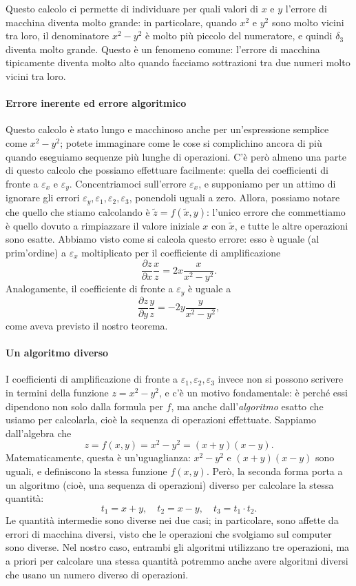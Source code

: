 \documentclass[a4paper]{report}
\theoremstyle{definition}
\theoremstyle{remark}
\begin{document}
Questo calcolo ci permette di individuare per quali valori di $x$ e $y$ l'errore di macchina diventa molto grande: in particolare, quando $x^2$ e $y^2$ sono molto vicini tra loro, il denominatore $x^2-y^2$ è molto più piccolo del numeratore, e quindi $\delta_3$ diventa molto grande. Questo è un fenomeno comune: l'errore di macchina tipicamente diventa molto alto quando facciamo sottrazioni tra due numeri molto vicini tra loro.

\paragraph{Errore inerente ed errore algoritmico} Questo calcolo è stato lungo e macchinoso anche per un'espressione semplice come $x^2-y^2$; potete immaginare come le cose si complichino ancora di più quando eseguiamo sequenze più lunghe di operazioni. C'è però almeno una parte di questo calcolo che possiamo effettuare facilmente: quella dei coefficienti di fronte a $\varepsilon_x$ e $\varepsilon_y$. Concentriamoci sull'errore $\varepsilon_x$, e supponiamo per un attimo di ignorare gli errori $\varepsilon_y, \varepsilon_1,\varepsilon_2,\varepsilon_3$, ponendoli uguali a zero. Allora, possiamo notare che quello che stiamo calcolando è $\tilde{z} = f(\tilde{x},y)$: l'unico errore che commettiamo è quello dovuto a rimpiazzare il valore iniziale $x$ con $\tilde{x}$, e tutte le altre operazioni sono esatte. Abbiamo visto come si calcola questo errore: esso è uguale (al prim'ordine) a $\varepsilon_x$ moltiplicato per il coefficiente di amplificazione
\[
\frac{\partial z}{\partial x} \frac{x}{z} = 2x\frac{x}{x^2-y^2}.
\]
Analogamente, il coefficiente di fronte a $\varepsilon_y$ è uguale a
\[
\frac{\partial z}{\partial y} \frac{y}{z} = -2y\frac{y}{x^2-y^2},
\]
come aveva previsto il nostro teorema.

\paragraph{Un algoritmo diverso}
I coefficienti di amplificazione di fronte a $\varepsilon_1,\varepsilon_2,\varepsilon_3$ invece non si possono scrivere in termini della funzione $z = x^2-y^2$, e c'è un motivo fondamentale: è perché essi dipendono non solo dalla formula per $f$, ma anche dall'\emph{algoritmo} esatto che usiamo per calcolarla, cioè la sequenza di operazioni effettuate. Sappiamo dall'algebra che
\[
z = f(x,y) = x^2 - y^2 = (x+y)(x-y).
\]
Matematicamente, questa è un'uguaglianza: $x^2-y^2$ e $(x+y)(x-y)$ sono uguali, e definiscono la stessa funzione $f(x,y)$. Però, la seconda forma porta a un algoritmo (cioè, una sequenza di operazioni) diverso per calcolare la stessa quantità:
\begin{equation}
    t_1 = x+y, \quad t_2 = x-y, \quad t_3 = t_1 \cdot t_2.    
\end{equation}
Le quantità intermedie sono diverse nei due casi; in particolare, sono affette da errori di macchina diversi, visto che le operazioni che svolgiamo sul computer sono diverse. Nel nostro caso, entrambi gli algoritmi utilizzano tre operazioni, ma a priori per calcolare una stessa quantità potremmo anche avere algoritmi diversi che usano un numero diverso di operazioni. 
\end{document}
